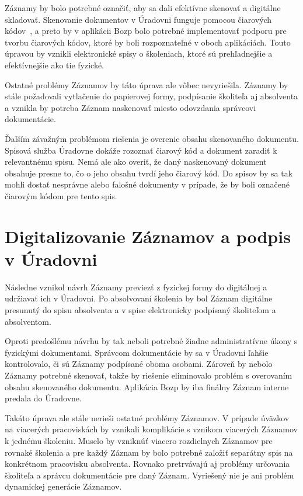 \documentclass[
  digital,     %
  oneside,     %
  nosansbold,  %
  nocolorbold, %
  lof,         %
  nolot,         %
]{fithesis4}
\begin{document}
Záznamy by bolo potrebné označiť, aby sa dali efektívne skenovať a digitálne skladovať. Skenovanie dokumentov v Úradovni funguje pomocou čiarových kódov~\cite{uradovna2024}, a preto by v aplikácii Bozp bolo potrebné implementovať podporu pre tvorbu čiarových kódov, ktoré by boli rozpoznateľné v oboch aplikáciách. Touto úpravou by vznikli elektronické spisy o školeniach, ktoré sú prehľadnejšie a efektívnejšie ako tie fyzické.

Ostatné problémy Záznamov by táto úprava ale vôbec nevyriešila. Záznamy by stále požadovali vytlačenie do papierovej formy, podpísanie školiteľa aj absolventa a vznikla by potreba Záznam naskenovať miesto odovzdania správcovi dokumentácie. 

Ďalším závažným problémom riešenia je overenie obsahu skenovaného dokumentu. Spisová služba Úradovne dokáže rozoznať čiarový kód a dokument zaradiť k relevantnému spisu. Nemá ale ako overiť, že daný naskenovaný dokument obsahuje presne to, čo o jeho obsahu tvrdí jeho čiarový kód. Do spisov by sa tak mohli dostať nesprávne alebo falošné dokumenty v prípade, že by boli označené čiarovým kódom pre tento spis.

\section{Digitalizovanie Záznamov a podpis v Úradovni}
Následne vznikol návrh Záznamy previezť z fyzickej formy do digitálnej a udržiavať ich v Úradovni. Po absolvovaní školenia by bol Záznam digitálne presunutý do spisu absolventa a v spise elektronicky podpísaný školiteľom a absolventom.

Oproti predošlému návrhu by tak neboli potrebné žiadne administratívne úkony s fyzickými dokumentami. Správcom dokumentácie by sa v Úradovni ľahšie kontrolovalo, či sú Záznamy podpísané oboma osobami. Zároveň by nebolo Záznamy potrebné skenovať, takže by riešenie eliminovalo problém s overovaním obsahu skenovaného dokumentu. Aplikácia Bozp by iba finálny Záznam interne predala do Úradovne.

Takáto úprava ale stále nerieši ostatné problémy Záznamov. V prípade úväzkov na viacerých pracoviskách by vznikali komplikácie s vznikom viacerých Záznamov k jednému školeniu. Muselo by vzniknúť viacero rozdielnych Záznamov pre rovnaké školenia a pre každý Záznam by bolo potrebné založiť separátny spis na konkrétnom pracovisku absolventa. Rovnako pretrvávajú aj problémy určovania školiteľa a správcu dokumentácie pre daný Záznam. Vyriešený nie je ani problém dynamickej generácie Záznamov.
\end{document}
